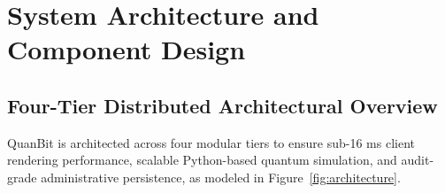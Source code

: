 \documentclass[11pt, a4paper]{article}
\begin{document}
\newpage

\section{System Architecture and Component Design}

\subsection{Four-Tier Distributed Architectural Overview}
QuanBit is architected across four modular tiers to ensure sub-16 ms client rendering performance, scalable Python-based quantum simulation, and audit-grade administrative persistence, as modeled in Figure~\ref{fig:architecture}.
\end{document}
